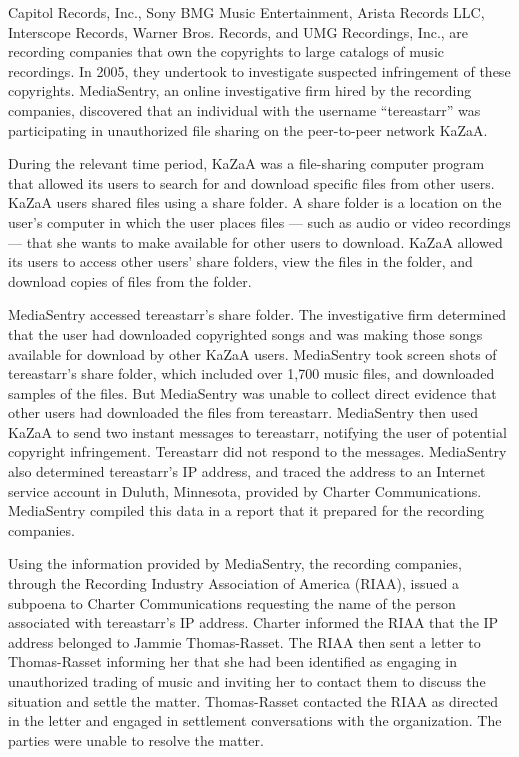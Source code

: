 
Capitol Records, Inc., Sony BMG Music Entertainment, Arista Records LLC,
Interscope Records, Warner Bros. Records, and UMG Recordings, Inc., are
recording companies that own the copyrights to large catalogs of music
recordings. In 2005, they undertook to investigate suspected infringement of
these copyrights. MediaSentry, an online investigative firm hired by the
recording companies, discovered that an individual with the username
``tereastarr'' was participating in unauthorized file sharing on the
peer-to-peer network KaZaA.

During the relevant time period, KaZaA was a file-sharing computer program that
allowed its users to search for and download specific files from other users.
KaZaA users shared files using a share folder. A share folder is a location on
the user's computer in which the user places files --- such as audio or video
recordings --- that she wants to make available for other users to download.
KaZaA allowed its users to access other users' share folders, view the files in
the folder, and download copies of files from the folder.

MediaSentry accessed tereastarr's share folder. The investigative firm
determined that the user had downloaded copyrighted songs and was making those
songs available for download by other KaZaA users. MediaSentry took screen
shots of tereastarr's share folder, which included over 1,700 music files, and
downloaded samples of the files. But MediaSentry was unable to collect direct
evidence that other users had downloaded the files from tereastarr. MediaSentry
then used KaZaA to send two instant messages to tereastarr, notifying the user
of potential copyright infringement. Tereastarr did not respond to the
messages. MediaSentry also determined tereastarr's IP address, and traced the
address to an Internet service account in Duluth, Minnesota, provided by
Charter Communications. MediaSentry compiled this data in a report that it
prepared for the recording companies.

Using the information provided by MediaSentry, the recording companies, through
the Recording Industry Association of America (RIAA), issued a subpoena to
Charter Communications requesting the name of the person associated with
tereastarr's IP address. Charter informed the RIAA that the IP address belonged
to Jammie Thomas-Rasset. The RIAA then sent a letter to Thomas-Rasset informing
her that she had been identified as engaging in unauthorized trading of music
and inviting her to contact them to discuss the situation and settle the
matter. Thomas-Rasset contacted the RIAA as directed in the letter and engaged
in settlement conversations with the organization. The parties were unable to
resolve the matter.

